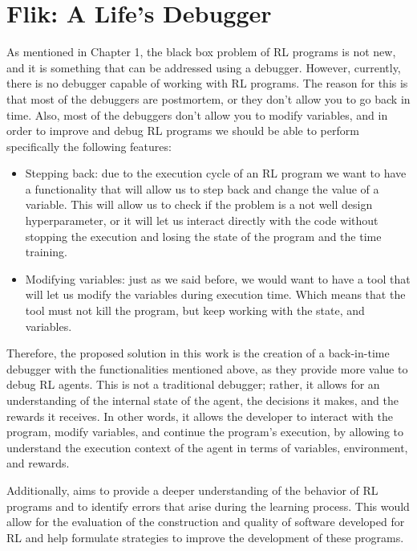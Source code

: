 
\chapter{Flik: A Life's Debugger}
\label{cha:solution}

As mentioned in Chapter 1, the black box problem of \ac{RL} programs is 
not new, and it is something 
that can be addressed using a debugger. However, currently, there is no 
debugger capable of working with RL programs. The reason for this is that 
most of the debuggers are postmortem, or they don't allow you to go back in 
time. Also, most of the debuggers don't allow you to modify variables, and in 
order to improve and debug \ac{RL} programs we should be able to perform 
specifically the following features:

\begin{itemize}
    \item Stepping back: due to the execution cycle of an \ac{RL} program we 
    want to have a functionality that will allow us to step back and change 
    the value of a variable. This will allow us to check if the problem is a 
    not well design hyperparameter, or it will let us interact directly with 
    the code without stopping the execution and losing the state of the program 
    and the time training.
    \item Modifying variables: just as we said before, we would want to have a 
    tool that will let us modify the variables during execution time. Which means
    that the tool must not kill the program, but keep working with the state, 
    and variables.
\end{itemize}

Therefore, the proposed solution in this work is the creation of a back-in-time debugger with the 
functionalities mentioned above, as they provide more value to debug \ac{RL} agents. This 
is not a traditional debugger; rather, it allows for an understanding of the 
internal state of the agent, the decisions it makes, and the rewards it 
receives. In other words, it allows the developer to interact with the program, modify
variables, and continue the program's execution, by allowing to understand 
the execution context of the agent in terms of variables, environment, and rewards. 

Additionally, aims to provide a deeper understanding of the behavior of 
RL programs and to identify errors that arise during the learning process. 
This would allow for the evaluation of the construction and quality of 
software developed for RL and help formulate strategies to improve the 
development of these programs.

